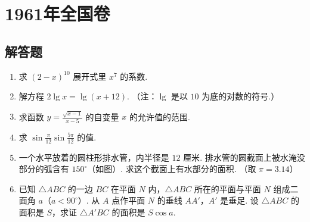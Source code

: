\chapter{1961年全国卷}

\section{解答题}

\begin{problem}
\begin{enumerate}
\item 求 \(\left(2-x\right)^{10}\) 展开式里 \(x^7\) 的系数.

\item 解方程 \(2\lg x=\lg\left(x+12\right)\). （注：\(\lg\) 是以 \(10\) 为底的对数的符号.）

\item 求函数 \(y=\frac{\sqrt{x-1}}{x-5}\) 的自变量 \(x\) 的允许值的范围.

\item 求 \(\sin\frac{\pi}{12}\sin\frac{5\pi}{12}\) 的值.

\item 一个水平放着的圆柱形排水管，内半径是 \(12\text{ 厘米}\). 排水管的圆截面上被水淹没部分的弧含有 \(150^\circ\)（如图）. 求这个截面上有水部分的面积. （取 \(\pi=3.14\)）

\item 已知 \(\triangle ABC\) 的一边 \(BC\) 在平面 \(N\) 内，\(\triangle ABC\) 所在的平面与平面 \(N\) 组成二面角 \(a\)（\(a<90^\circ\)）. 从 \(A\) 点作平面 \(N\) 的垂线 \(AA'\)，\(A'\) 是垂足. 设 \(\triangle ABC\) 的面积是 \(S\)，求证 \(\triangle A'BC\) 的面积是 \(S\cos a\).
\end{enumerate}

\end{problem}


